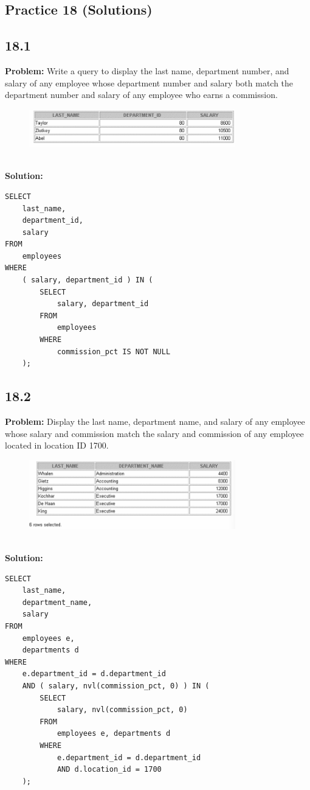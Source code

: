 \documentclass[12pt,a4paper]{article}
\begin{document}
\begin{itemize}
\section{Practice 18 (Solutions)}

\subsection*{18.1}
\textbf{Problem:} Write a query to display the last name, department number, and salary of any employee whose department number and salary both match the department number and salary of any employee who earns a commission.
\\
\begin{figure}[htbp]
  \centering
  \includegraphics[width=0.8\textwidth]{Screenshots/181.png}
\end{figure}\\
\textbf{Solution:}
\begin{lstlisting}
SELECT 
    last_name,
    department_id,
    salary
FROM
    employees
WHERE
    ( salary, department_id ) IN (
        SELECT
            salary, department_id
        FROM
            employees
        WHERE
            commission_pct IS NOT NULL
    );
\end{lstlisting}

\subsection*{18.2}
\textbf{Problem:} Display the last name, department name, and salary of any employee whose salary and commission match the salary and commission of any employee located in location ID 1700.
\\
\begin{figure}[htbp]
  \centering
  \includegraphics[width=0.8\textwidth]{Screenshots/182.png}
\end{figure}\\
\textbf{Solution:}
\begin{lstlisting}
SELECT 
    last_name,
    department_name,
    salary
FROM
    employees e,
    departments d
WHERE
    e.department_id = d.department_id
    AND ( salary, nvl(commission_pct, 0) ) IN (
        SELECT
            salary, nvl(commission_pct, 0)
        FROM
            employees e, departments d
        WHERE
            e.department_id = d.department_id
            AND d.location_id = 1700
    );
\end{lstlisting}


\end{itemize}
\end{document}
